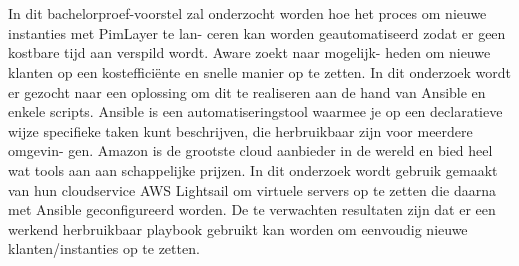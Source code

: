 
%
%
%
%
%

%



\chapter*{}

In dit bachelorproef-voorstel zal onderzocht worden hoe het proces om nieuwe instanties met PimLayer te lan-
ceren kan worden geautomatiseerd zodat er geen kostbare tijd aan verspild wordt. Aware zoekt naar mogelijk-
heden om nieuwe klanten op een kostefficiënte en snelle manier op te zetten. In dit onderzoek wordt er gezocht
naar een oplossing om dit te realiseren aan de hand van Ansible en enkele scripts. Ansible is een automatiseringstool waarmee
je op een declaratieve wijze specifieke taken kunt beschrijven, die herbruikbaar zijn voor meerdere omgevin-
gen. Amazon is de grootste cloud aanbieder in de wereld en bied heel wat tools aan aan schappelijke prijzen. In
dit onderzoek wordt gebruik gemaakt van hun cloudservice AWS Lightsail om virtuele servers op te zetten die
daarna met Ansible geconfigureerd worden. De te verwachten resultaten zijn dat er een werkend herbruikbaar
playbook gebruikt kan worden om eenvoudig nieuwe klanten/instanties op te zetten.
